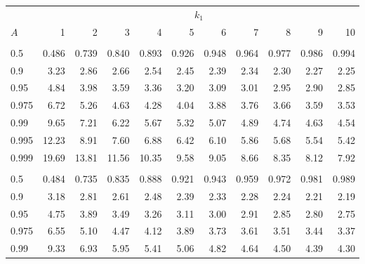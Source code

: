 \documentclass[]{article}
\begin{document}
\begin{table}[H]
\centering
\begin{tabular}{lrrrrrrrrrr}
\toprule
\multicolumn{1}{c}{ } & \multicolumn{10}{c}{$k_1$} \\
\cmidrule(l{3pt}r{3pt}){2-11}
\hspace{1.1em}$A$ & 1 & 2 & 3 & 4 & 5 & 6 & 7 & 8 & 9 & 10\\
\midrule
\addlinespace[0.3em]
\multicolumn{11}{l}{\textbf{$k_2=11$}}\\
\hspace{1em}0.5 & 0.486 & 0.739 & 0.840 & 0.893 & 0.926 & 0.948 & 0.964 & 0.977 & 0.986 & 0.994\\
\hspace{1em}0.9 & 3.23 & 2.86 & 2.66 & 2.54 & 2.45 & 2.39 & 2.34 & 2.30 & 2.27 & 2.25\\
\hspace{1em}0.95 & 4.84 & 3.98 & 3.59 & 3.36 & 3.20 & 3.09 & 3.01 & 2.95 & 2.90 & 2.85\\
\hspace{1em}0.975 & 6.72 & 5.26 & 4.63 & 4.28 & 4.04 & 3.88 & 3.76 & 3.66 & 3.59 & 3.53\\
\hspace{1em}0.99 & 9.65 & 7.21 & 6.22 & 5.67 & 5.32 & 5.07 & 4.89 & 4.74 & 4.63 & 4.54\\
\hspace{1em}0.995 & 12.23 & 8.91 & 7.60 & 6.88 & 6.42 & 6.10 & 5.86 & 5.68 & 5.54 & 5.42\\
\hspace{1em}0.999 & 19.69 & 13.81 & 11.56 & 10.35 & 9.58 & 9.05 & 8.66 & 8.35 & 8.12 & 7.92\\
\addlinespace[0.3em]
\multicolumn{11}{l}{\textbf{$k_2=12$}}\\
\hspace{1em}0.5 & 0.484 & 0.735 & 0.835 & 0.888 & 0.921 & 0.943 & 0.959 & 0.972 & 0.981 & 0.989\\
\hspace{1em}0.9 & 3.18 & 2.81 & 2.61 & 2.48 & 2.39 & 2.33 & 2.28 & 2.24 & 2.21 & 2.19\\
\hspace{1em}0.95 & 4.75 & 3.89 & 3.49 & 3.26 & 3.11 & 3.00 & 2.91 & 2.85 & 2.80 & 2.75\\
\hspace{1em}0.975 & 6.55 & 5.10 & 4.47 & 4.12 & 3.89 & 3.73 & 3.61 & 3.51 & 3.44 & 3.37\\
\hspace{1em}0.99 & 9.33 & 6.93 & 5.95 & 5.41 & 5.06 & 4.82 & 4.64 & 4.50 & 4.39 & 4.30\\

\end{tabular}
\end{table}
\end{document}
